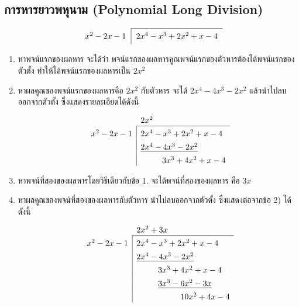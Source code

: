 \subsection{การหารยาวพหุนาม (Polynomial Long Division)}

\[
\begin{tabular}{r|l}
	\cline{2-2}
	$x^2 - 2x - 1$ & $\vphantom{\dfrac{1}{1}} 2x^4 - x^3 + 2x^2 + x - 4$ \\
\end{tabular}
\]

\begin{conceptbox}
	\begin{enumerate}
		\item หาพจน์แรกของผลหาร จะได้ว่า พจน์แรกของผลหารคูณพจน์แรกของตัวหารต้องได้พจน์แรกของตัวตั้ง ทำให้ได้พจน์แรกของผลหารเป็น $2x^2$
		
		\item หาผลคูณของพจน์แรกของผลหารคือ $2x^2$ กับตัวหาร จะได้ $2x^4 - 4x^3 - 2x^2$ แล้วนำไปลบออกจากตัวตั้ง ซึ่งแสดงรายละเอียดได้ดังนี้
		\[
		\setlength{\extrarowheight}{1.0ex} %
		\begin{array}{r|l}
			\multicolumn{1}{c}{} & 2x^2 \\ \cline{2-2}
			x^2 - 2x - 1 & 2x^4 - x^3 + 2x^2 + x - 4 \\
			& \underline{2x^4 - 4x^3 - 2x^2} \\
			& \phantom{2x^4 - \ } 3x^3 + 4x^2 + x - 4
		\end{array}
		\]
		
		\item หาพจน์ที่สองของผลหารโดยวิธีเดียวกับข้อ 1. จะได้พจน์ที่สองของผลหาร คือ $3x$
		
		\item หาผลคูณของพจน์ที่สองของผลหารกับตัวหาร นำไปลบออกจากตัวตั้ง ซึ่งแสดงต่อจากข้อ 2) ได้ดังนี้
		\[
		\setlength{\extrarowheight}{1.0ex} %
		\begin{array}{r|l}
			\multicolumn{1}{c}{} & 2x^2 + 3x \\ \cline{2-2}
			x^2 - 2x - 1 & 2x^4 - x^3 + 2x^2 + x - 4 \\
			& \underline{2x^4 - 4x^3 - 2x^2} \\
			& \phantom{2x^4 - \ } 3x^3 + 4x^2 + x - 4 \\
			& \phantom{2x^4 - \ } \underline{3x^3 - 6x^2 - 3x} \\
			& \phantom{2x^4 - 3x^3 - \ } 10x^2 + 4x - 4
		\end{array}
		\]
		

\end{enumerate}
\end{conceptbox}
